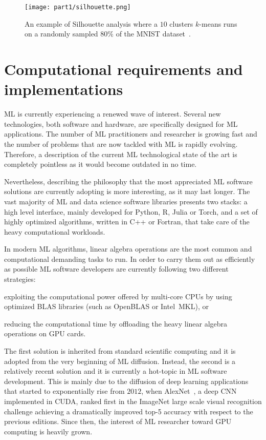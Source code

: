 	\begin{figure}[]
		\centering
		\texttt{[image: part1/silhouette.png]}
		\caption{An example of Silhouette analysis where a $10$ clusters $k$-means runs on a randomly sampled $80\%$ of the MNIST dataset~\cite{lecun2010mnist}.} \label{fig:silhouette}
	\end{figure}


\section{Computational requirements and implementations} \label{sec:implementation}

ML is currently experiencing a renewed wave of interest. Several new technologies, both software and hardware, are specifically designed for ML applications. The number of ML practitioners and researcher is growing fast and the number of problems that are now tackled with ML is rapidly evolving. Therefore, a description of the current ML technological state of the art is completely pointless as it would become outdated in no time.

Nevertheless, describing the philosophy that the most appreciated ML software solutions are currently adopting is more interesting, as it may last longer. The vast majority of ML and data science software libraries presents two stacks: a high level interface, mainly developed for Python, R, Julia or Torch, and a set of highly optimized algorithms, written in C++ or Fortran, that take care of the heavy computational workloads.

In modern ML algorithms, linear algebra operations are the most common and computational demanding tasks to run. In order to carry them out as efficiently as possible ML software developers are currently following two different strategies:
\begin{enumerate*}[label=(\roman*)]
	\item exploiting the computational power offered by multi-core \ac{CPU}s by using optimized \ac{BLAS} libraries (such as OpenBLAS or Intel\textsuperscript{\textregistered}~\ac{MKL}), or
	\item reducing the computational time by offloading the heavy linear algebra operations on \ac{GPU} cards.
\end{enumerate*}

The first solution is inherited from standard scientific computing and it is adopted from the very beginning of ML diffusion. Instead, the second is a relatively recent solution and it is currently a hot-topic in ML software development. This is mainly due to the diffusion of deep learning applications that started to exponentially rise from $2012$, when AlexNet~\cite{krizhevsky2012imagenet}, a deep CNN implemented in {\sc CUDA}, ranked first in the ImageNet large scale visual recognition challenge achieving a dramatically improved top-5 accuracy with respect to the previous editions.
Since then, the interest of ML researcher toward GPU computing is heavily grown.

